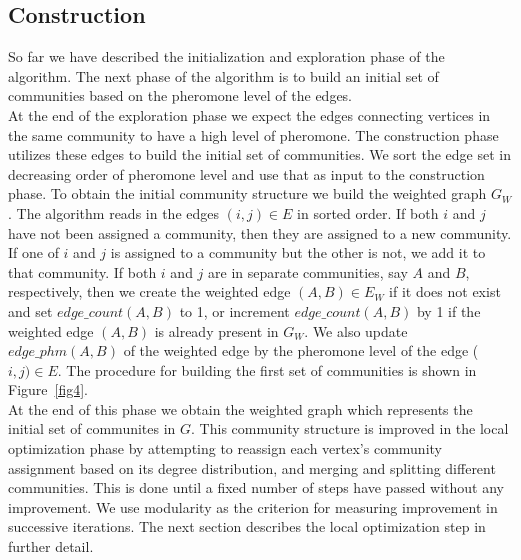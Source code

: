 \begin{spacing}{1.5}
\section{Construction}
So far we have described the initialization and exploration phase of the algorithm. The next phase of the algorithm is to build an initial set of communities based on the pheromone level of the edges.\\
\indent At the end of the exploration phase we expect the edges connecting vertices in the same community to have a high level of pheromone. The construction phase utilizes these edges to build the initial set of communities. We sort the edge set in decreasing order of pheromone level and use that as input to the construction phase. To obtain the initial community structure we build the weighted graph $G_W$. The algorithm reads in the edges $(i, j)\in E$ in sorted order. If both $i$ and $j$ have not been assigned a community, then they are assigned to a new community. If one of $i$ and $j$ is assigned to a community but the other is not, we add it to that community. If both $i$ and $j$ are in separate communities, say $A$ and $B$, respectively, then we create the weighted edge $(A, B) \in E_W$ if it does not exist and set $edge\_count(A, B)$ to 1, or increment $edge\_count(A,B)$ by 1 if the weighted edge $(A, B)$ is already present in $G_W$. We also update $edge\_phm(A, B)$ of the weighted edge by the pheromone level of the edge ($i, j) \in E$. The procedure for building the first set of communities is shown in Figure~\ref{fig4}. \\
\indent At the end of this phase we obtain the weighted graph which represents the initial set of communites in $G$. This community structure is improved in the local optimization phase by attempting to reassign each vertex's community assignment based on its degree distribution, and merging and splitting different communities. This is done until a fixed number of steps have passed without any improvement. We use modularity as the criterion for measuring improvement in successive iterations. The next section describes the local optimization step in further detail.

\end{spacing}
